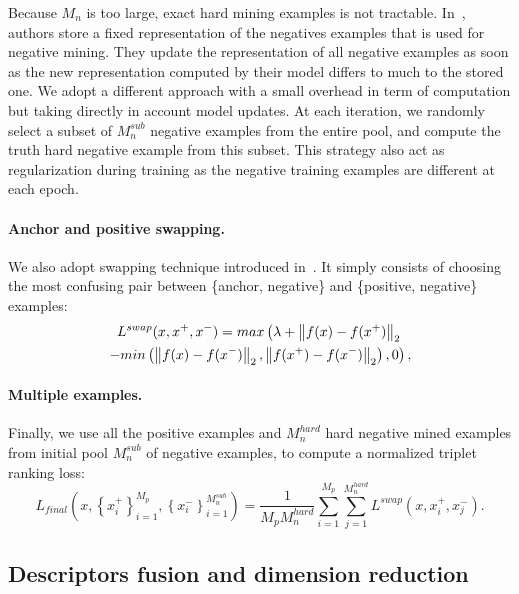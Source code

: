 Because $M_n$ is too large, exact hard mining examples is not tractable. In~\citep{Arandjelovic2017}, authors store a fixed representation of the negatives examples that is used for negative mining. They update the representation of all negative examples as soon as the new representation computed by their model differs to much to the stored one. We adopt a different approach with a small overhead in term of computation but taking directly in account model updates. At each iteration, we randomly select a subset of $M_n^{sub}$ negative examples from the entire pool, and compute the truth hard negative example from this subset. This strategy also act as regularization during training as the negative training examples are different at each epoch.

\paragraph{Anchor and positive swapping.} We also adopt swapping technique introduced in~\citep{Balntas2016}. It simply consists of choosing the most confusing pair between \{anchor, negative\} and \{positive, negative\} examples:
\begin{multline}
\label{eq:triplet_loss_w_swap}
L^{swap}(x, x^+, x^-) = max\left(\lambda + \left\lVert f(x) - f(x^+)\right\rVert_2 \right. \\
\left. - min\left(\left\lVert f(x) - f(x^-)\right\rVert_2, \left\lVert f(x^+) - f(x^-)\right\rVert_2 \right), 0 \right),
\end{multline}

\paragraph{Multiple examples.} Finally, we use all the positive examples and $M_n^{hard}$ hard negative mined examples from initial pool $M_n^{sub}$ of negative examples, to compute a normalized triplet ranking loss:
\begin{equation}
	L_{final}\left( x, \left\lbrace x^+_i\right\rbrace_{i=1}^{M_p}, \left\lbrace x^-_i\right\rbrace_{i=1}^{M_n^{sub}} \right) = \frac{1}{M_p M_n^{hard}} \sum_{i=1}^{M_p} \sum_{j=1}^{M_n^{hard}} L^{swap}\left( x, x^+_i, x^-_j \right).
\end{equation}

\subsection{Descriptors fusion and dimension reduction}

\label{subsec:fuse_desc}
